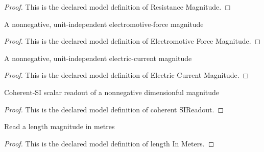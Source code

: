 \begin{proof}
  This is the declared model definition of Resistance Magnitude.
\end{proof}
\begin{definition}
  \label{def:physics:phyx-mini-0982:phyxminiproblems-problemphyxmini0982-electromotiveforcemagnitude}
  A nonnegative, unit-independent electromotive-force magnitude
\end{definition}
\begin{proof}
  This is the declared model definition of Electromotive Force Magnitude.
\end{proof}
\begin{definition}
  \label{def:physics:phyx-mini-0982:phyxminiproblems-problemphyxmini0982-electriccurrentmagnitude}
  A nonnegative, unit-independent electric-current magnitude
\end{definition}
\begin{proof}
  This is the declared model definition of Electric Current Magnitude.
\end{proof}
\begin{definition}
  \label{def:physics:phyx-mini-0982:phyxminiproblems-problemphyxmini0982-coherentsireadout}
  Coherent-SI scalar readout of a nonnegative dimensionful magnitude
\end{definition}
\begin{proof}
  This is the declared model definition of coherent SIReadout.
\end{proof}
\begin{definition}
  \label{def:physics:phyx-mini-0982:phyxminiproblems-problemphyxmini0982-lengthinmeters}
  Read a length magnitude in metres
\end{definition}
\begin{proof}
  This is the declared model definition of length In Meters.
\end{proof}
